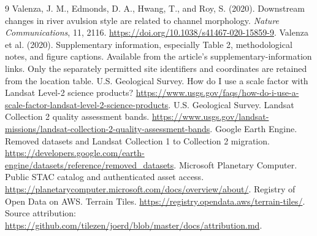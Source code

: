 \documentclass[11pt]{article}
\begin{document}
\begin{thebibliography}{9}
 Valenza, J. M., Edmonds, D. A., Hwang, T., and Roy, S. (2020).
Downstream changes in river avulsion style are related to channel morphology.
\emph{Nature Communications}, 11, 2116.
\url{https://doi.org/10.1038/s41467-020-15859-9}.
 Valenza et al. (2020). Supplementary information, especially
Table 2, methodological notes, and figure captions. Available from the
article's supplementary-information links. Only the separately permitted
site identifiers and coordinates are retained from the location table.
 U.S. Geological Survey. How do I use a scale factor with
Landsat Level-2 science products?
\url{https://www.usgs.gov/faqs/how-do-i-use-a-scale-factor-landsat-level-2-science-products}.
 U.S. Geological Survey. Landsat Collection 2 quality assessment
bands. \url{https://www.usgs.gov/landsat-missions/landsat-collection-2-quality-assessment-bands}.
 Google Earth Engine. Removed datasets and Landsat Collection
1 to Collection 2 migration.
\url{https://developers.google.com/earth-engine/datasets/reference/removed_datasets}.
 Microsoft Planetary Computer. Public STAC catalog and authenticated
asset access. \url{https://planetarycomputer.microsoft.com/docs/overview/about/}.
 Registry of Open Data on AWS. Terrain Tiles.
\url{https://registry.opendata.aws/terrain-tiles/}. Source attribution:
\url{https://github.com/tilezen/joerd/blob/master/docs/attribution.md}.
\end{thebibliography}
\end{document}
